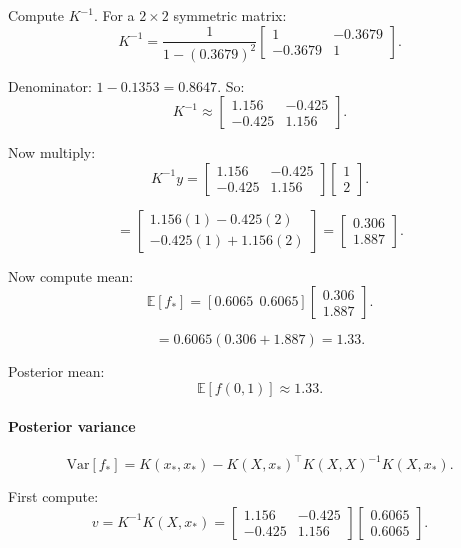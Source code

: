 Compute $K^{-1}$.
For a $2 \times 2$ symmetric matrix:
$$
K^{-1} = \frac{1}{1 - (0.3679)^2}
\begin{bmatrix}
1 & -0.3679 \\
-0.3679 & 1
\end{bmatrix}.
$$

Denominator: $1 - 0.1353 = 0.8647$.
So:
$$
K^{-1} \approx
\begin{bmatrix}
1.156 & -0.425 \\
-0.425 & 1.156
\end{bmatrix}.
$$

Now multiply:
$$
K^{-1} y =
\begin{bmatrix}
1.156 & -0.425 \\
-0.425 & 1.156
\end{bmatrix}
\begin{bmatrix}
1 \\
2
\end{bmatrix}.
$$

$$
= \begin{bmatrix}
1.156(1) - 0.425(2) \\
-0.425(1) + 1.156(2)
\end{bmatrix}
= \begin{bmatrix}
0.306 \\
1.887
\end{bmatrix}.
$$

Now compute mean:
$$
\mathbb{E}[f_*] = [0.6065 \ \ 0.6065] \begin{bmatrix}0.306 \\ 1.887\end{bmatrix}.
$$

$$
= 0.6065(0.306 + 1.887) = 1.33.
$$

Posterior mean:
$$
\mathbb{E}[f(0,1)] \approx 1.33.
$$

\paragraph{Posterior variance}
$$
\text{Var}[f_*] = K(x_*,x_*) - K(X,x_*)^\top K(X,X)^{-1} K(X,x_*).
$$

First compute:
$$
v = K^{-1} K(X,x_*) =
\begin{bmatrix}
1.156 & -0.425 \\
-0.425 & 1.156
\end{bmatrix}
\begin{bmatrix}
0.6065 \\
0.6065
\end{bmatrix}.
$$

